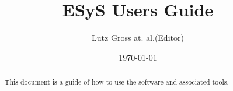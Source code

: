 \documentclass{manual}
\title{ESyS Users Guide}
\author{Lutz Gross at. al.(Editor)}
\date{\today}
\begin{document}
\maketitle



\begin{abstract}
This document is a guide of how to use the \ESyS software and
associated tools.
\end{abstract}

\tableofcontents




% 



%



\makemodindex

\printindex
%



\end{document}
